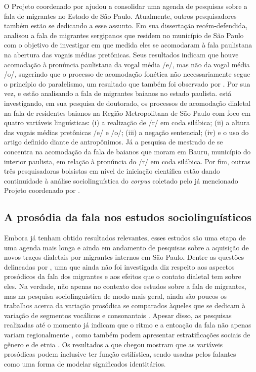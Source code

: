\documentclass[
		a4paper,	%
		12pt,		%
		]{article}	%
\begin{document}
	O Projeto coordenado por \citet{Oushiro2018} ajudou a consolidar uma agenda
	de pesquisas sobre a fala de migrantes no Estado de São Paulo. Atualmente,
	outros pesquisadores também estão se dedicando a esse assunto. Em sua
	dissertação recém-defendida, \citet{Santana2019} analisou a fala de
	migrantes sergipanos que residem no município de São Paulo com o objetivo de
	investigar em que medida eles se acomodaram à fala paulistana na abertura
	das vogais médias pretônicas.  Seus resultados indicam que houve acomodação
	à pronúncia paulistana da vogal média /e/, mas não da vogal média /o/,
	sugerindo que o processo de acomodação fonética não necessariamente segue o
	princípio do paralelismo, um resultado que também foi observado por
	\citet{Oushiro2019}. Por sua vez, \citet{Souza2017} e \citet{Oliveira2019}
	estão analisando a fala de migrantes baianos no estado paulista.
	\citet{Souza2017} está investigando, em sua pesquisa de doutorado, os
	processos de acomodação dialetal na fala de residentes baianos na Região
	Metropolitana de São Paulo com foco em quatro variáveis linguísticas: (i) a
	realização de /r/ em coda silábica; (ii) a altura das vogais médias
	pretônicas /e/ e /o/; (iii) a negação sentencial; (iv) e o uso do artigo
	definido diante de antropônimos. Já a pesquisa de mestrado de
	\citet{Oliveira2019} se concentra na acomodação da fala de baianos que moram
	em Bauru, município do interior paulista, em relação à pronúncia do /r/ em
	coda silábica. Por fim, outras três pesquisadoras bolsistas em nível de
	iniciação científica estão dando continuidade à análise sociolinguística do
	\emph{corpus} coletado pelo já mencionado Projeto coordenado por
	\citet{Oushiro2018}.

	\subsection{A prosódia da fala nos estudos sociolinguísticos}
	\label{prosodia-socio}

	Embora já tenham obtido resultados relevantes, esses estudos são uma etapa
	de uma agenda mais longa e ainda em andamento de pesquisas sobre a aquisição
	de novos traços dialetais por migrantes internos em São Paulo. Dentre as
	questões delineadas por \citet{Oushiro2018}, uma que ainda não foi
	investigada diz respeito aos aspectos prosódicos da fala dos migrantes e aos
	efeitos que o contato dialetal tem sobre eles. Na verdade, não apenas no
	contexto dos estudos sobre a fala de migrantes, mas na pesquisa
	sociolinguística de modo mais geral, ainda são poucos os trabalhos acerca da
	variação prosódica se comparados àqueles que se dedicam à variação de
	segmentos vocálicos e consonantais \citep{Thomas2013, Hay.Drager2007}.
	Apesar disso, as pesquisas realizadas até o momento já indicam que o ritmo e
	a entoação da fala não apenas variam regionalmente
	\citep{Clopper.Smiljanic2015, Grabe.etal2000}, como também podem apresentar
	estratificações sociais de gênero \citep{Lowry2011} e de etnia
	\citep{Thomas2013, Szakay2006}.  Os resultados a que \citet{Podesva2011}
	chegou mostram que as variáveis prosódicas podem inclusive ter função
	estilística, sendo usadas pelos falantes como uma forma de modelar
	significados identitários.
\end{document}
